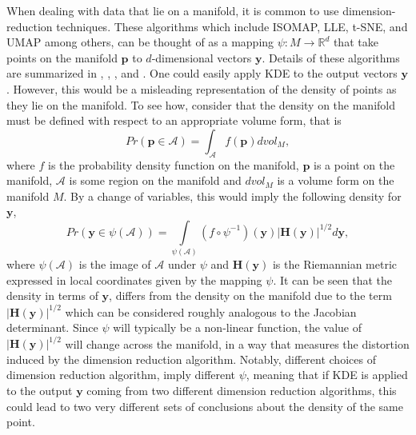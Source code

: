 \documentclass[12pt]{article}
\begin{document}
When dealing with data that lie on a manifold, it is common to use dimension-reduction techniques. These algorithms which include ISOMAP, LLE, t-SNE, and UMAP among others, can be thought of as a mapping \(\psi:M\rightarrow \mathbb{R}^d\) that take points on the manifold \(\bm{p}\) to \(d\)-dimensional vectors \(\bm{y}\). Details of these algorithms are summarized in \textcite{Cayton2005-dp}, \textcite{Lee2007-wq}, \textcite{Izenman2012-mx}, and \textcite{Cheng2021-dh}. One could easily apply KDE to the output vectors \(\bm{y}\). However, this would be a misleading representation of the density of points as they lie on the manifold. To see how, consider that the density on the manifold must be defined with respect to an appropriate volume form, that is
\[Pr(\bm{p}\in\mathcal{A})=\int_\mathcal{A} f(\bm{p}) dvol_M,\]
where \(f\) is the probability density function on the manifold, \(\bm{p}\) is a point on the manifold, \(\mathcal{A}\) is some region on the manifold and \(dvol_M\) is a volume form on the manifold \(M\). By a change of variables, this would imply the following density for \(\bm{y}\),
\begin{equation}
\label{eq:changevar}
Pr(\bm{y}\in\psi(\mathcal{A}))=\int\limits_{\psi(\mathcal{A})} (f\circ\psi^{-1})(\bm{y})|\bm{H}(\bm{y})|^{1/2}d\bm{y},
\end{equation}
where \(\psi(\mathcal{A})\) is the image of \(\mathcal{A}\) under \(\psi\) and \(\bm{H}(\bm{y})\) is the Riemannian metric expressed in local coordinates given by the mapping \(\psi\). It can be seen that the density in terms of \(\bm{y}\), differs from the density on the manifold due to the term \(|\bm{H}(\bm{y})|^{1/2}\) which can be considered roughly analogous to the Jacobian determinant. Since \(\psi\) will typically be a non-linear function, the value of \(|\bm{H}(\bm{y})|^{1/2}\) will change across the manifold, in a way that measures the distortion induced by the dimension reduction algorithm. Notably, different choices of dimension reduction algorithm, imply different \(\psi\), meaning that if KDE is applied to the output \(\bm{y}\) coming from two different dimension reduction algorithms, this could lead to two very different sets of conclusions about the density of the same point.
\end{document}
